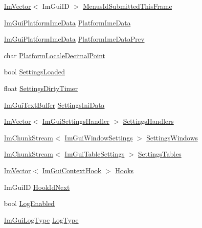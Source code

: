 \begin{DoxyCompactItemize}
\item 
\hyperlink{structImVector}{Im\+Vector}$<$ Im\+Gui\+ID $>$ \hyperlink{structImGuiContext_a2e6135b1a52d2dcf7ef18c301caa943b}{Menus\+Id\+Submitted\+This\+Frame}
\item 
\hyperlink{structImGuiPlatformImeData}{Im\+Gui\+Platform\+Ime\+Data} \hyperlink{structImGuiContext_a084e716b3a64cf2ad9de9a5f7cb32c31}{Platform\+Ime\+Data}
\item 
\hyperlink{structImGuiPlatformImeData}{Im\+Gui\+Platform\+Ime\+Data} \hyperlink{structImGuiContext_ad2719ffa6b669a551932a6c4b2fd43f0}{Platform\+Ime\+Data\+Prev}
\item 
char \hyperlink{structImGuiContext_a5d5fd7d993ebbec34ca233ee3846a548}{Platform\+Locale\+Decimal\+Point}
\item 
bool \hyperlink{structImGuiContext_a1043af3ac30119c12c2e85923e1ec20b}{Settings\+Loaded}
\item 
float \hyperlink{structImGuiContext_a7e0dd3aef4a4f0fd85ed39e13824f2ab}{Settings\+Dirty\+Timer}
\item 
\hyperlink{structImGuiTextBuffer}{Im\+Gui\+Text\+Buffer} \hyperlink{structImGuiContext_a5b4bad72af7065aa7e57b32fedd5ea0e}{Settings\+Ini\+Data}
\item 
\hyperlink{structImVector}{Im\+Vector}$<$ \hyperlink{structImGuiSettingsHandler}{Im\+Gui\+Settings\+Handler} $>$ \hyperlink{structImGuiContext_aded9a2cb80c805407734b8bf7d0ef515}{Settings\+Handlers}
\item 
\hyperlink{structImChunkStream}{Im\+Chunk\+Stream}$<$ \hyperlink{structImGuiWindowSettings}{Im\+Gui\+Window\+Settings} $>$ \hyperlink{structImGuiContext_a17f0de5b1060388d02bec8ee2cb164ae}{Settings\+Windows}
\item 
\hyperlink{structImChunkStream}{Im\+Chunk\+Stream}$<$ \hyperlink{structImGuiTableSettings}{Im\+Gui\+Table\+Settings} $>$ \hyperlink{structImGuiContext_ad2ede9b6bf347485792dbd3c9ec4f5eb}{Settings\+Tables}
\item 
\hyperlink{structImVector}{Im\+Vector}$<$ \hyperlink{structImGuiContextHook}{Im\+Gui\+Context\+Hook} $>$ \hyperlink{structImGuiContext_a68184290b56a87584f085608790caef5}{Hooks}
\item 
Im\+Gui\+ID \hyperlink{structImGuiContext_a4c1de2c1a15e1dda468035b774b84ee1}{Hook\+Id\+Next}
\item 
bool \hyperlink{structImGuiContext_a2508bec1862aa4477eca2c79d6924b82}{Log\+Enabled}
\item 
\hyperlink{imgui__internal_8h_ac65915203eef19cd87f2ff1cde435c1e}{Im\+Gui\+Log\+Type} \hyperlink{structImGuiContext_a832ec584c0e3558c15b342ac077515d5}{Log\+Type}

\end{DoxyCompactItemize}
